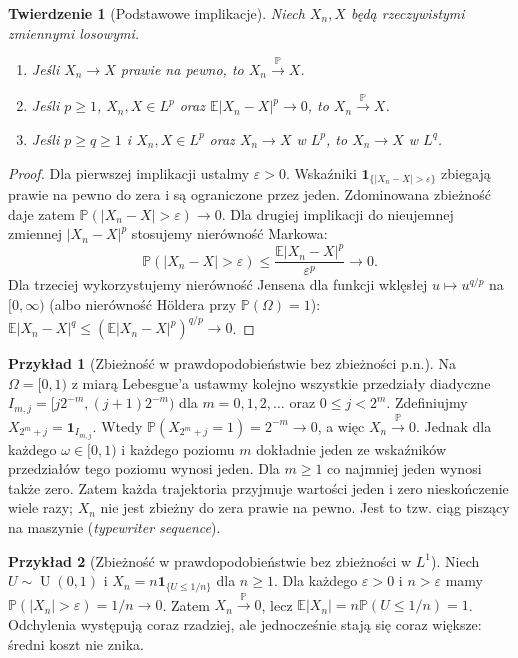 \documentclass[11pt,a4paper,oneside]{report}
\numberwithin{equation}{chapter}
\theoremstyle{plain}
\newtheorem{twierdzenie}{Twierdzenie}[chapter]
\theoremstyle{definition}
\newtheorem{przyklad}{Przykład}[chapter]
\theoremstyle{remark}
\newcommand{\Prob}{\mathbb{P}}
\newcommand{\E}{\mathbb{E}}
\newcommand{\ind}[1]{\mathbf{1}_{#1}}
\newcommand{\Unif}{\operatorname{U}}
\begin{document}
\begin{twierdzenie}[Podstawowe implikacje]
Niech $X_n,X$ będą rzeczywistymi zmiennymi losowymi.
\begin{enumerate}
\item Jeśli $X_n\to X$ prawie na pewno, to
 $X_n\xrightarrow{\Prob}X$.
\item Jeśli $p\geq1$, $X_n,X\in L^p$ oraz
 $\E|X_n-X|^p\to0$, to $X_n\xrightarrow{\Prob}X$.
\item Jeśli $p\geq q\geq1$ i $X_n,X\in L^p$ oraz
 $X_n\to X$ w $L^p$, to $X_n\to X$ w $L^q$.
\end{enumerate}
\end{twierdzenie}
\begin{proof}
Dla pierwszej implikacji ustalmy $\varepsilon>0$.
Wskaźniki $\ind{\{|X_n-X|>\varepsilon\}}$ zbiegają
prawie na pewno do zera i są ograniczone przez jeden.
Zdominowana zbieżność daje zatem
$\Prob(|X_n-X|>\varepsilon)\to0$.
Dla drugiej implikacji do nieujemnej zmiennej
$|X_n-X|^p$ stosujemy nierówność Markowa:
\[
\Prob(|X_n-X|>\varepsilon)
\leq\frac{\E|X_n-X|^p}{\varepsilon^p}\longrightarrow0.
\]
Dla trzeciej wykorzystujemy nierówność Jensena
dla funkcji wklęsłej $u\mapsto u^{q/p}$ na
$[0,\infty)$ (albo nierówność H\"oldera przy
$\Prob(\Omega)=1$):
$\E|X_n-X|^q\leq(\E|X_n-X|^p)^{q/p}\to0$.
\end{proof}

\begin{przyklad}[Zbieżność w prawdopodobieństwie bez zbieżności p.n.]
Na $\Omega=[0,1)$ z miarą Lebesgue'a ustawmy kolejno
wszystkie przedziały diadyczne
$I_{m,j}=[j2^{-m},(j+1)2^{-m})$ dla
$m=0,1,2,\ldots$ oraz $0\leq j<2^m$.
Zdefiniujmy $X_{2^m+j}=\ind{I_{m,j}}$.
Wtedy $\Prob(X_{2^m+j}=1)=2^{-m}\to0$, a więc
$X_n\xrightarrow{\Prob}0$. Jednak dla każdego
$\omega\in[0,1)$ i każdego poziomu $m$ dokładnie
jeden ze wskaźników przedziałów tego poziomu wynosi
jeden. Dla $m\geq1$ co najmniej jeden wynosi także zero.
Zatem każda trajektoria przyjmuje wartości jeden i zero
nieskończenie wiele razy; $X_n$ nie jest zbieżny do zera
prawie na pewno. Jest to tzw. ciąg piszący na maszynie
(\emph{typewriter sequence}).
\end{przyklad}

\begin{przyklad}[Zbieżność w prawdopodobieństwie bez zbieżności w $L^1$]
Niech $U\sim\Unif(0,1)$ i
$X_n=n\ind{\{U\leq1/n\}}$ dla $n\geq1$.
Dla każdego $\varepsilon>0$ i $n>\varepsilon$ mamy
$\Prob(|X_n|>\varepsilon)=1/n\to0$.
Zatem $X_n\xrightarrow{\Prob}0$, lecz
$\E|X_n|=n\Prob(U\leq1/n)=1$.
Odchylenia występują coraz rzadziej, ale jednocześnie
stają się coraz większe: średni koszt nie znika.
\end{przyklad}
\end{document}
